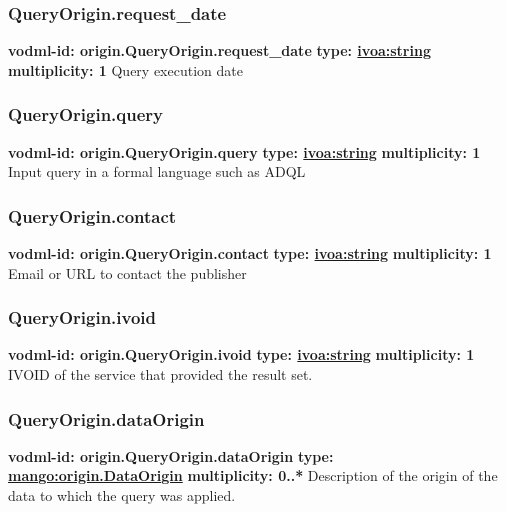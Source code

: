     \subsubsection{QueryOrigin.request\_date}
    \textbf{vodml-id: origin.QueryOrigin.request\_date} \newline
    \textbf{type: \hyperref[sect:ivoa]{ivoa:string}} \newline
    \textbf{multiplicity: 1} \newline
    Query execution date

    \subsubsection{QueryOrigin.query}
    \textbf{vodml-id: origin.QueryOrigin.query} \newline
    \textbf{type: \hyperref[sect:ivoa]{ivoa:string}} \newline
    \textbf{multiplicity: 1} \newline
    Input query in a formal language such as ADQL \citep{2023ivoa.spec.1215M}

    \subsubsection{QueryOrigin.contact}
    \textbf{vodml-id: origin.QueryOrigin.contact} \newline
    \textbf{type: \hyperref[sect:ivoa]{ivoa:string}} \newline
    \textbf{multiplicity: 1} \newline
    Email or URL to contact the publisher

    \subsubsection{QueryOrigin.ivoid}
    \textbf{vodml-id: origin.QueryOrigin.ivoid} \newline
    \textbf{type: \hyperref[sect:ivoa]{ivoa:string}} \newline
    \textbf{multiplicity: 1} \newline
    IVOID of the service that provided the result set.

    \subsubsection{QueryOrigin.dataOrigin}
    \textbf{vodml-id: origin.QueryOrigin.dataOrigin} \newline
    \textbf{type: \hyperref[sect:origin.DataOrigin]{mango:origin.DataOrigin}} \newline
    \textbf{multiplicity: 0..*} \newline
    Description of the origin of the data to which the query was applied.

